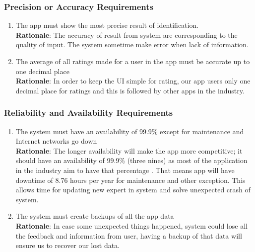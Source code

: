 \subsubsection{Precision or Accuracy Requirements}
\label{ssub:precision_or_accuracy_requirements}
\begin{enumerate}[{PR-PA}1. ]
	\item The app must show the most precise result of identification.
	\\ \textbf{Rationale}: The accuracy of result from system are corresponding to the quality of input. The system sometime make error when lack of information.
	\item The average of all ratings made for a user in the app must be accurate up to one decimal place
	\\ \textbf{Rationale}: In order to keep the UI simple for rating, our app users only one decimal place for ratings and this is followed by other apps in the industry. 
\end{enumerate}

\subsubsection{Reliability and Availability Requirements}
\label{ssub:reliability_and_availability_requirements}
\begin{enumerate}[{PR-RA}1. ]
	\item The system must have an availability of 99.9\% except for maintenance and Internet networks go down
	\\ \textbf{Rationale}: The longer availability will make the app more competitive; it should have an availability of 99.9\% (three nines) as most of the application in the industry aim to have that percentage \cite{Britannica2025_WritingSystems}. That means app will have downtime of 8.76 hours per year for maintenance and other exception. This allows time for updating new expert in system and solve unexpected crash of system.
	\item The system must create backups of all the app data
	\\ \textbf{Rationale}: In case some unexpected things happened, system could lose all the feedback and information from user, having a backup of that data will ensure us to recover our lost data.
\end{enumerate}


